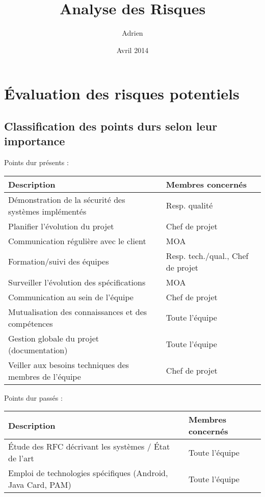 \documentclass{../../res/univ-projet}
\title{Analyse des Risques}
\author{Adrien \bsc{Smondack}}
\date{Avril 2014}
\begin{document}
\maketitle

\section{Évaluation des risques potentiels}
\subsection{Classification des points durs selon leur importance}

	Points dur présents :
	\begin{tabular}{| p{9cm} | p{5cm} |} 
		\hline
		\cellcolor{gray} Description & \cellcolor{gray} Membres concernés \\ \hline
		Démonstration de la sécurité des systèmes implémentés & Resp. qualité \\ \hline
		Planifier l'évolution du projet & Chef de projet \\ \hline
		Communication régulière avec le client & MOA \\ \hline
		Formation/suivi des équipes & Resp. tech./qual., Chef de projet \\ \hline
		Surveiller l'évolution des spécifications & MOA \\ \hline
		Communication au sein de l'équipe & Chef de projet \\ \hline
		Mutualisation des connaissances et des compétences & Toute l'équipe \\ \hline
		Gestion globale du projet (documentation) & Toute l'équipe\\ \hline
		Veiller aux besoins techniques des membres de l'équipe & Chef de projet \\ \hline
	\end{tabular}

	Points dur passés :
	\begin{tabular}{| p{9cm} | p{5cm} |} 
		\hline
		\cellcolor{gray} Description & \cellcolor{gray} Membres concernés \\ \hline
		Étude des RFC décrivant les systèmes / \'Etat de l'art & Toute l'équipe \\ \hline
		Emploi de technologies spécifiques (Android, Java Card, PAM) & Toute l'équipe \\ \hline
	\end{tabular}
	
\end{document}
